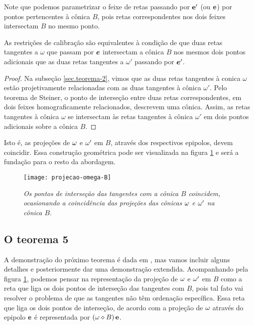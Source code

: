 Note que podemos parametrizar o feixe de retas passando por ${\bf e'}$ (ou ${\bf e}$) por pontos pertencentes à cônica $B$, pois retas correspondentes nos dois feixes intersectam $B$ no mesmo ponto. 

\begin{teorema}
As restrições de calibração são equivalentes à condição de que duas retas tangentes a $\omega$ que passam por $\boldsymbol{e}$ intersectam a cônica $B$ nos mesmos dois pontos adicionais que as duas retas tangentes a $\omega'$ passando por $\boldsymbol{e}'$.
\end{teorema}

\begin{proof}
Na subseção \ref{sec.teorema-2}, vimos que as duas retas tangentes à conica $\omega$ estão projetivamente relacionadas com as duas tangentes à cônica $\omega'$. Pelo teorema de Steiner, o ponto de interseção entre duas retas correspondentes, em dois feixes homograficamente relacionados, descrevem uma cônica. Assim, as retas tangentes à cônica $\omega$ se intersectam às retas tangentes à cônica $\omega'$ em dois pontos adicionais sobre a cônica $B$. 
\end{proof}

Isto é, as projeções de ${\bf \omega}$ e ${\bf \omega'}$ em $B$, através dos respectivos epipolos, devem coincidir. Essa construção geométrica pode ser visualizada na figura \ref{omega-B} e será a fundação para o resto da abordagem. 

\begin{figure}[!htb]
\centering
\texttt{[image: projecao-omega-B]}
\caption{\textit{Os pontos de interseção das tangentes com a cônica $B$ coincidem, ocasionando a coincidência das projeções das cônicas ${\bf \omega}$ e ${\bf \omega'}$ na cônica $B$.}}
\label{omega-B}
\end{figure}

\subsection{O teorema 5}\label{sec.teorema-5}

 A demonstração do próximo teorema é dada em \cite{2503343}, mas vamos incluir alguns detalhes e posteriormente dar uma demonstração extendida. Acompanhando pela figura \ref{omega-B}, podemos pensar na representação da projeção de  ${\bf \omega}$ e ${\bf \omega'}$ em $B$ como a reta que liga os dois pontos de interseção das tangentes com $B$, pois tal fato vai resolver o problema de que as tangentes não têm ordenação específica. Essa reta que liga os dois pontos de interseção, de acordo com a projeção de ${\bf \omega}$ através do epipolo ${\bf e}$ é representada por $({\bf \omega}\diamond B)\,{\bf e}$.

